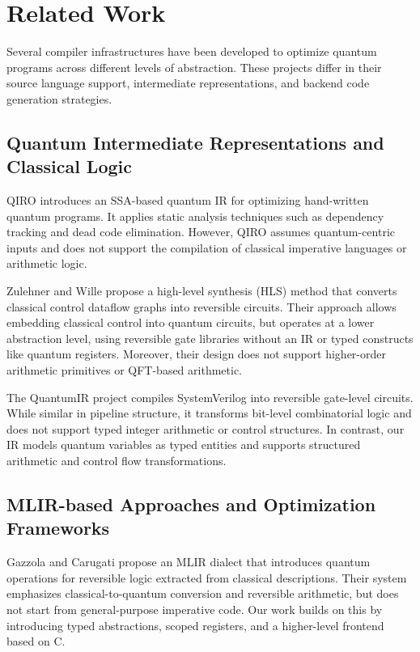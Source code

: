 \documentclass[conference]{IEEEtran}
\begin{document}

\section{Related Work}

Several compiler infrastructures have been developed to optimize quantum programs across different levels of abstraction. These projects differ in their source language support, intermediate representations, and backend code generation strategies.

\subsection{Quantum Intermediate Representations and Classical Logic}

QIRO introduces an SSA-based quantum IR for optimizing hand-written quantum programs. It applies static analysis techniques such as dependency tracking and dead code elimination. However, QIRO assumes quantum-centric inputs and does not support the compilation of classical imperative languages or arithmetic logic.

Zulehner and Wille propose a high-level synthesis (HLS) method that converts classical control dataflow graphs into reversible circuits. Their approach allows embedding classical control into quantum circuits, but operates at a lower abstraction level, using reversible gate libraries without an IR or typed constructs like quantum registers. Moreover, their design does not support higher-order arithmetic primitives or QFT-based arithmetic.

The QuantumIR project compiles SystemVerilog into reversible gate-level circuits. While similar in pipeline structure, it transforms bit-level combinatorial logic and does not support typed integer arithmetic or control structures. In contrast, our IR models quantum variables as typed entities and supports structured arithmetic and control flow transformations.

\subsection{MLIR-based Approaches and Optimization Frameworks}

Gazzola and Carugati propose an MLIR dialect that introduces quantum operations for reversible logic extracted from classical descriptions. Their system emphasizes classical-to-quantum conversion and reversible arithmetic, but does not start from general-purpose imperative code. Our work builds on this by introducing typed abstractions, scoped registers, and a higher-level frontend based on C.
\end{document}
